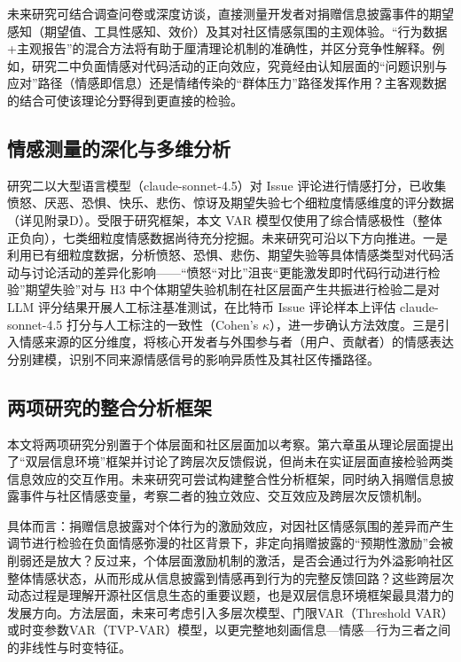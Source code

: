 未来研究可结合调查问卷或深度访谈，直接测量开发者对捐赠信息披露事件的期望感知（期望值、工具性感知、效价）及其对社区情感氛围的主观体验。“行为数据+主观报告”的混合方法将有助于厘清理论机制的准确性，并区分竞争性解释。例如，研究二中负面情感对代码活动的正向效应，究竟经由认知层面的“问题识别与应对”路径（情感即信息）还是情绪传染的“群体压力”路径发挥作用？主客观数据的结合可使该理论分野得到更直接的检验。

\subsection{情感测量的深化与多维分析}

研究二以大型语言模型（claude-sonnet-4.5）对 Issue 评论进行情感打分，已收集愤怒、厌恶、恐惧、快乐、悲伤、惊讶及期望失验七个细粒度情感维度的评分数据（详见附录D）。受限于研究框架，本文 VAR 模型仅使用了综合情感极性（整体正负向），七类细粒度情感数据尚待充分挖掘。未来研究可沿以下方向推进。一是利用已有细粒度数据，分析愤怒、恐惧、悲伤、期望失验等具体情感类型对代码活动与讨论活动的差异化影响——“愤怒“对比”沮丧“更能激发即时代码行动进行检验”期望失验”对与 H3 中个体期望失验机制在社区层面产生共振进行检验二是对 LLM 评分结果开展人工标注基准测试，在比特币 Issue 评论样本上评估 claude-sonnet-4.5 打分与人工标注的一致性（Cohen's $\kappa$），进一步确认方法效度。三是引入情感来源的区分维度，将核心开发者与外围参与者（用户、贡献者）的情感表达分别建模，识别不同来源情感信号的影响异质性及其社区传播路径。

\subsection{两项研究的整合分析框架}

本文将两项研究分别置于个体层面和社区层面加以考察。第六章虽从理论层面提出了“双层信息环境”框架并讨论了跨层次反馈假说，但尚未在实证层面直接检验两类信息效应的交互作用。未来研究可尝试构建整合性分析框架，同时纳入捐赠信息披露事件与社区情感变量，考察二者的独立效应、交互效应及跨层次反馈机制。

具体而言：捐赠信息披露对个体行为的激励效应，对因社区情感氛围的差异而产生调节进行检验在负面情感弥漫的社区背景下，非定向捐赠披露的“预期性激励”会被削弱还是放大？反过来，个体层面激励机制的激活，是否会通过行为外溢影响社区整体情感状态，从而形成从信息披露到情感再到行为的完整反馈回路？这些跨层次动态过程是理解开源社区信息生态的重要议题，也是双层信息环境框架最具潜力的发展方向。方法层面，未来可考虑引入多层次模型、门限VAR（Threshold VAR）或时变参数VAR（TVP-VAR）模型，以更完整地刻画信息—情感—行为三者之间的非线性与时变特征。


